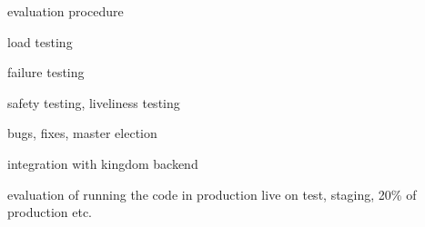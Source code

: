 evaluation procedure

load testing

failure testing

safety testing, liveliness testing

bugs, fixes, master election

integration with kingdom backend

evaluation of running the code in production
  live on test, staging, 20\% of production etc.

